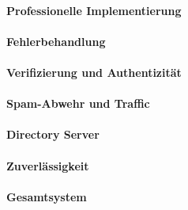 \documentclass[	%
				a4paper, %
				onecolumn, %
				oneside, %
				titlepage, %
				openany, %
				12pt] %
				{report}
\begin{document}
		\subsubsection{Professionelle Implementierung}
			
		\subsubsection{Fehlerbehandlung}
			
		\subsubsection{Verifizierung und Authentizität}
					
		\subsubsection{Spam-Abwehr und Traffic}
			
		\subsubsection{Directory Server}
				
		\subsubsection{Zuverlässigkeit}
					
		\subsubsection{Gesamtsystem}
				
		
		


\cleardoublepage
{}
{}
\listoffigures

\cleardoublepage
{}
{}
\listoftables

\cleardoublepage
{}
{}
\lstlistoflistings

\cleardoublepage
{}
\markboth{\uppercase{\ListOfAbbreviations}}{}
\chapter*{\ListOfAbbreviations}


\cleardoublepage
{}
{}

\end{document}
